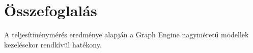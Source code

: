 \chapter{Összefoglalás}

A teljesítménymérés eredménye alapján a Graph Engine nagyméretű modellek kezelésekor rendkívül hatékony. 